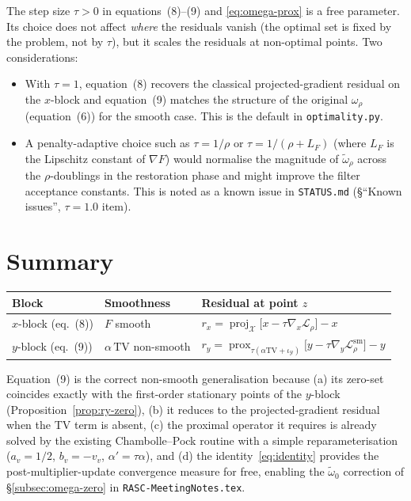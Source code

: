\documentclass[11pt]{article}
\newcommand{\proj}{\operatorname{proj}}
\newcommand{\prox}{\operatorname{prox}}
\newcommand{\TV}{\mathrm{TV}}
\theoremstyle{plain}
\theoremstyle{remark}
\begin{document}
The step size $\tau > 0$ in equations~(8)--(9) and \eqref{eq:omega-prox} is
a free parameter.  Its choice does not affect \emph{where} the residuals
vanish (the optimal set is fixed by the problem, not by $\tau$), but it
scales the residuals at non-optimal points.  Two considerations:
\begin{itemize}
  \item With $\tau = 1$, equation~(8) recovers the classical projected-gradient
    residual on the $x$-block and equation~(9) matches the structure of the
    original $\omega_\rho$ (equation~(6)) for the smooth case.  This is the
    default in \texttt{optimality.py}.
  \item A penalty-adaptive choice such as $\tau = 1/\rho$ or $\tau = 1/(\rho +
    L_F)$ (where $L_F$ is the Lipschitz constant of $\nabla F$) would
    normalise the magnitude of $\widetilde{\omega}_\rho$ across the
    $\rho$-doublings in the restoration phase and might improve the filter
    acceptance constants.  This is noted as a known issue in
    \texttt{STATUS.md} (\S ``Known issues'', $\tau = 1.0$ item).
\end{itemize}

\section{Summary}

\begin{center}
\begin{tabular}{@{}lll@{}}
\toprule
\textbf{Block} & \textbf{Smoothness} & \textbf{Residual at point $z$}\\
\midrule
$x$-block (eq.~(8)) & $F$ smooth &
  $r_x = \proj_{\mathcal{X}}\bigl[x - \tau\nabla_x \mathcal{L}_\rho\bigr] - x$ \\[4pt]
$y$-block (eq.~(9)) & $\alpha\,\TV$ non-smooth &
  $r_y = \prox_{\tau(\alpha\TV+\iota_{\mathcal{Y}})}\bigl[y-\tau\nabla_y \mathcal{L}^{\mathrm{sm}}_\rho\bigr] - y$ \\
\bottomrule
\end{tabular}
\end{center}

\medskip\noindent
Equation~(9) is the correct non-smooth generalisation because
(a) its zero-set coincides exactly with the first-order stationary points of
the $y$-block (Proposition~\ref{prop:ry-zero}), (b) it reduces to the
projected-gradient residual when the TV term is absent, (c) the proximal
operator it requires is already solved by the existing Chambolle--Pock
routine with a simple reparameterisation ($a_v = 1/2$, $b_v = -v_v$,
$\alpha' = \tau\alpha$), and (d) the identity~\eqref{eq:identity} provides
the post-multiplier-update convergence measure for free, enabling the
$\widetilde{\omega}_0$ correction of \S\ref{subsec:omega-zero} in
\texttt{RASC-MeetingNotes.tex}.
\end{document}
